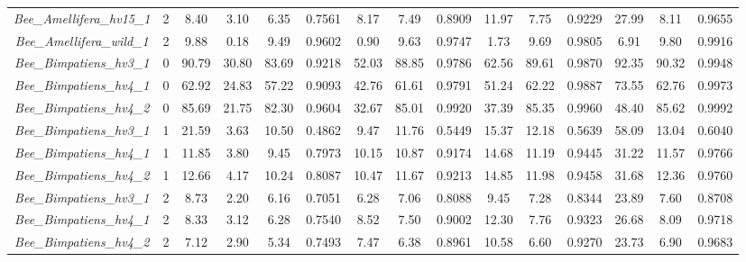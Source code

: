 \documentclass[11pt]{article}
\begin{document}
\begin{table}[H]
{\begin{tabular}{ccccccccccccccc}
\textit{Bee\_Amellifera\_hv15\_1}&2&8.40   &3.10 &6.35  &0.7561  &8.17 &7.49  &0.8909  &11.97&7.75  &0.9229  &27.99&8.11 &0.9655\\
\textit{Bee\_Amellifera\_wild\_1}&2&9.88   &0.18 &9.49  &0.9602  &0.90 &9.63  &0.9747  &1.73 &9.69  &0.9805  &6.91 &9.80  &0.9916\\

\textit{Bee\_Bimpatiens\_hv3\_1}&0&90.79  &30.80&83.69&0.9218  &52.03&88.85&0.9786  &62.56&89.61&0.9870  &92.35&90.32&0.9948\\
\textit{Bee\_Bimpatiens\_hv4\_1}&0&62.92  &24.83&57.22&0.9093  &42.76&61.61&0.9791  &51.24&62.22&0.9887  &73.55&62.76&0.9973\\
\textit{Bee\_Bimpatiens\_hv4\_2}&0&85.69  &21.75&82.30&0.9604  &32.67&85.01&0.9920  &37.39&85.35&0.9960  &48.40&85.62&0.9992\\

\textit{Bee\_Bimpatiens\_hv3\_1}&1&21.59  &3.63 &10.50&0.4862  &9.47 &11.76&0.5449  &15.37&12.18&0.5639  &58.09&13.04&0.6040\\
\textit{Bee\_Bimpatiens\_hv4\_1}&1&11.85  &3.80 &9.45 &0.7973  &10.15&10.87&0.9174  &14.68&11.19&0.9445  &31.22&11.57&0.9766\\
\textit{Bee\_Bimpatiens\_hv4\_2}&1&12.66  &4.17 &10.24&0.8087  &10.47&11.67&0.9213  &14.85&11.98&0.9458  &31.68&12.36&0.9760\\

\textit{Bee\_Bimpatiens\_hv3\_1}&2&8.73   &2.20 &6.16 &0.7051  &6.28 &7.06 &0.8088  &9.45 &7.28 &0.8344  &23.89&7.60 &0.8708\\
\textit{Bee\_Bimpatiens\_hv4\_1}&2&8.33   &3.12 &6.28 &0.7540  &8.52 &7.50 &0.9002  &12.30&7.76 &0.9323  &26.68&8.09 &0.9718\\
\textit{Bee\_Bimpatiens\_hv4\_2}&2&7.12   &2.90 &5.34 &0.7493  &7.47 &6.38 &0.8961  &10.58&6.60 &0.9270  &23.73&6.90 &0.9683\\

        \bottomrule
        \end{tabular}%
        }
        \end{table}
\end{document}
